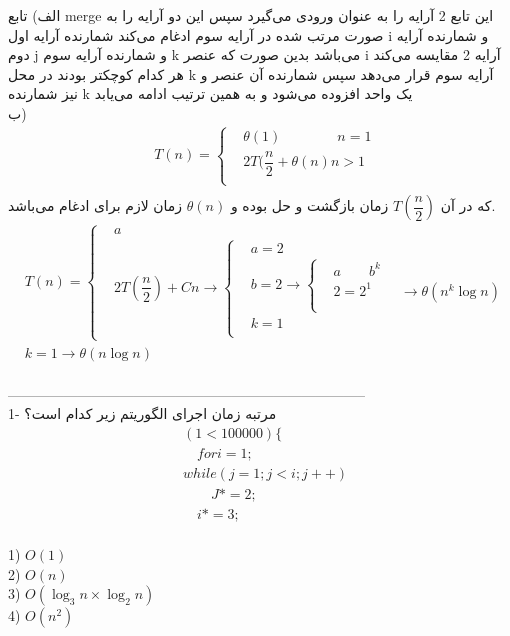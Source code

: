 \documentclass{book}
\begin{document}
الف) تابع merge این تابع 2 آرایه را به عنوان ورودی می‌گیرد سپس این دو آرایه را به صورت مرتب شده در آرایه سوم ادغام می‌کند شمارنده آرایه اول i و شمارنده آرایه دوم j و شمارنده آرایه سوم k می‌باشد بدین صورت که عنصر i آرایه 2 مقایسه می‌کند هر کدام کوچکتر بودند در محل k آرایه سوم قرار می‌دهد سپس شمارنده آن عنصر و نیز شمارنده k یک واحد افزوده می‌شود و به همین ترتیب ادامه می‌یابد\\

ب)\\
\begin{align*}
&T(n)=\begin{cases}
&\theta (1) \qquad\qquad n=1\\
&2T(\dfrac{n}{2}+\theta (n) n>1\\
\end{cases}\\
\end{align*}
که در آن $T(\dfrac{n}{2})$ زمان بازگشت و حل بوده و $\theta (n)$ زمان لازم برای ادغام می‌باشد.\\
\begin{align*}
&T(n)=\begin{cases}
&a \\
&2T(\dfrac{n}{2}) + Cn \to \begin{cases}
&a = 2\\
&b = 2 \to \begin{cases}
&a \qquad b^k\\
&2 = 2^1 \qquad \to \theta (n^k \log n)\\
\end{cases} \\
&k = 1 \\
\end{cases}
\end{cases}\\
&k=1\to \theta (n\log n)\\
\end{align*}

-----------------------------------------------------------------------------\\
1- مرتبه زمان اجرای الگوریتم زیر کدام است؟
\begin{align*}
&(1<100000)\{\\
&\quad fori=1;\\
&while(j=1;j<i;j++)\\
&\qquad J*=2;\\
&\quad i*=3;\\
\end{align*}

1) $O(1)$ \\
2) $O(n)$\\
3) $O(\log_3 n\times \log_2 n)$\\
4) $O(n^2)$\\
\end{document}
